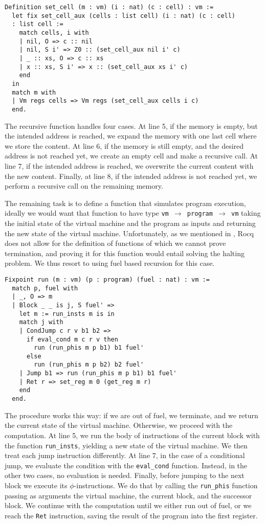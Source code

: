 \begin{lstlisting}[style=Rocq]
Definition set_cell (m : vm) (i : nat) (c : cell) : vm :=
  let fix set_cell_aux (cells : list cell) (i : nat) (c : cell)
  : list cell :=
    match cells, i with
    | nil, O => c :: nil
    | nil, S i' => Z0 :: (set_cell_aux nil i' c)
    | _ :: xs, O => c :: xs
    | x :: xs, S i' => x :: (set_cell_aux xs i' c)
    end
  in
  match m with
  | Vm regs cells => Vm regs (set_cell_aux cells i c)
  end.
\end{lstlisting}

The recursive function handles four cases.  At line 5, if the memory is empty, but the intended address is reached, we expand the memory with one last cell where we store the content. At line 6, if the memory is still empty, and the desired address is not reached yet, we create an empty cell and make a recursive call. At line 7, if the intended address is reached, we overwrite the current content with the new content. Finally, at line 8, if the intended address is not reached yet, we perform a recursive call on the remaining memory.

The remaining task is to define a function that simulates program execution, ideally we would want that function to have type \texttt{vm $\to$ program $\to$ vm} taking the initial state of the virtual machine and the program as inputs and returning the new state of the virtual machine.
Unfortunately, as we mentioned in , Rocq does not allow for the definition of functions of which we cannot prove termination, and proving it for this function would entail solving the halting problem. We thus resort to using fuel based recursion for this case.

\begin{lstlisting}[style=Rocq]
Fixpoint run (m : vm) (p : program) (fuel : nat) : vm :=
  match p, fuel with
  | _, O => m
  | Block _ _ is j, S fuel' =>
    let m := run_insts m is in
    match j with
    | CondJump c r v b1 b2 =>
      if eval_cond m c r v then
        run (run_phis m p b1) b1 fuel'
      else
        run (run_phis m p b2) b2 fuel'
    | Jump b1 => run (run_phis m p b1) b1 fuel'
    | Ret r => set_reg m 0 (get_reg m r)
    end
  end.
\end{lstlisting}

The procedure works this way: if we are out of fuel, we terminate, and we return the current state of the virtual machine. Otherwise, we proceed with the computation.
At line 5, we run the body of instructions of the current block with the function \texttt{run\_insts}, yielding a new state of the virtual machine. We then treat each jump instruction differently. At line 7, in the case of a conditional jump, we evaluate the condition with the \texttt{eval\_cond} function. Instead, in the other two cases, no evaluation is needed. Finally, before jumping to the next block we execute its $\phi$-instructions. We do that by calling the \texttt{run\_phis} function passing as arguments the virtual machine, the current block, and the successor block.
We continue with the computation until we either run out of fuel, or we reach the \texttt{Ret} instruction, saving the result of the program into the first register.